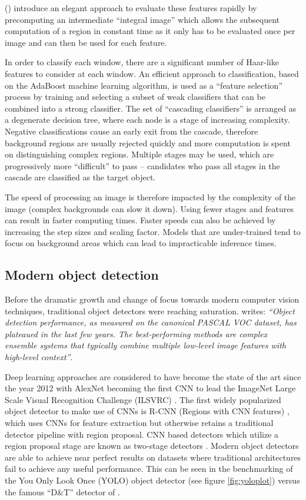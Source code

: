 \documentclass[a4paper,twoside,12pt]{report}
\begin{document}
\citeauthor{vjdet} (\citeyear{vjdet}) introduce an elegant approach to evaluate these features rapidly by precomputing an intermediate ``integral image'' which allows the subsequent computation of a region in constant time as it only has to be evaluated once per image and can then be used for each feature.

In order to classify each window, there are a significant number of Haar-like features to consider at each window. An efficient approach to classification, based on the AdaBoost machine learning algorithm, is used as a ``feature selection'' process by training and selecting a subset of weak classifiers that can be combined into a strong classifier. The set of ``cascading classifiers'' is arranged as a degenerate decision tree, where each node is a stage of increasing complexity. Negative classifications cause an early exit from the cascade, therefore background regions are usually rejected quickly and more computation is spent on distinguishing complex regions.  Multiple stages may be used, which are progressively more ``difficult'' to pass -- candidates who pass all stages in the cascade are classified as the target object.

The speed of processing an image is therefore impacted by the complexity of the image (complex backgrounds can slow it down). Using fewer stages and features can result in faster computing times. Faster speeds can also be achieved by increasing the step sizes and scaling factor. Models that are under-trained tend to focus on background areas which can lead to impracticable inference times. 

\newpage
\subsection{Modern object detection}

Before the dramatic growth and change of focus towards modern computer vision techniques, traditional object detectors were reaching saturation. \cite{rcnn} writes: \textit{``Object detection performance, as measured on the canonical PASCAL VOC dataset, has plateaued in the last few years. The best-performing methods are complex ensemble systems that typically combine multiple low-level image features with high-level context''}.

Deep learning approaches are considered to have become the state of the art since the year 2012 with AlexNet becoming the first CNN to lead the ImageNet Large Scale Visual Recognition Challenge (ILSVRC) \citep{alexnet}. The first widely popularized object detector to make use of CNNs is R-CNN (Regions with CNN features) \citep{rcnn}, which uses CNNs for feature extraction but otherwise retains a traditional detector pipeline with region proposal. CNN based detectors which utilize a region proposal stage are known as two-stage detectors \citep{comprehensive}. Modern object detectors are able to achieve near perfect results on datasets where traditional architectures fail to achieve any useful performance. This can be seen in the benchmarking of the You Only Look Once (YOLO) object detector (see figure \ref{fig:yoloplot}) \citep{yolo} versus the famous ``D\&T'' detector of \cite{hog}.
\end{document}
